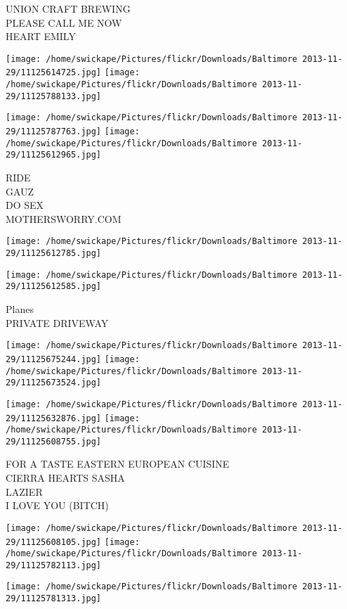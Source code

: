 \documentclass[10pt,letterpaper]{article}
\begin{document}
UNION CRAFT BREWING\\
PLEASE CALL ME NOW\\
HEART EMILY
\pagebreak

\texttt{[image: /home/swickape/Pictures/flickr/Downloads/Baltimore 2013-11-29/11125614725.jpg]}
\texttt{[image: /home/swickape/Pictures/flickr/Downloads/Baltimore 2013-11-29/11125788133.jpg]}

\texttt{[image: /home/swickape/Pictures/flickr/Downloads/Baltimore 2013-11-29/11125787763.jpg]}
\texttt{[image: /home/swickape/Pictures/flickr/Downloads/Baltimore 2013-11-29/11125612965.jpg]}

RIDE\\
GAUZ\\
DO SEX\\
MOTHERSWORRY.COM
\pagebreak

\texttt{[image: /home/swickape/Pictures/flickr/Downloads/Baltimore 2013-11-29/11125612785.jpg]}

\vspace{0.25in}
\texttt{[image: /home/swickape/Pictures/flickr/Downloads/Baltimore 2013-11-29/11125612585.jpg]}

Planes\\
PRIVATE DRIVEWAY
\pagebreak

\texttt{[image: /home/swickape/Pictures/flickr/Downloads/Baltimore 2013-11-29/11125675244.jpg]}
\texttt{[image: /home/swickape/Pictures/flickr/Downloads/Baltimore 2013-11-29/11125673524.jpg]}

\texttt{[image: /home/swickape/Pictures/flickr/Downloads/Baltimore 2013-11-29/11125632876.jpg]}
\texttt{[image: /home/swickape/Pictures/flickr/Downloads/Baltimore 2013-11-29/11125608755.jpg]}

FOR A TASTE EASTERN EUROPEAN CUISINE\\
CIERRA HEARTS SASHA\\
LAZIER\\
I LOVE YOU (BITCH)
\pagebreak

\texttt{[image: /home/swickape/Pictures/flickr/Downloads/Baltimore 2013-11-29/11125608105.jpg]}
\texttt{[image: /home/swickape/Pictures/flickr/Downloads/Baltimore 2013-11-29/11125782113.jpg]}

\texttt{[image: /home/swickape/Pictures/flickr/Downloads/Baltimore 2013-11-29/11125781313.jpg]}
\end{document}
